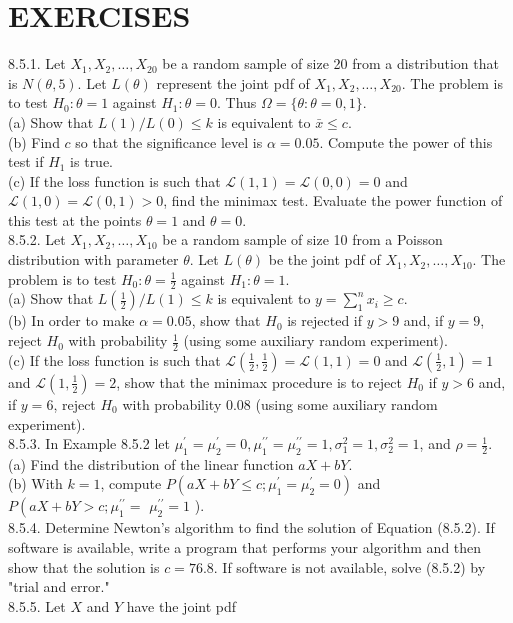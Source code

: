 \section*{EXERCISES}
8.5.1. Let $X_{1}, X_{2}, \ldots, X_{20}$ be a random sample of size 20 from a distribution that is $N(\theta, 5)$. Let $L(\theta)$ represent the joint pdf of $X_{1}, X_{2}, \ldots, X_{20}$. The problem is to test $H_{0}: \theta=1$ against $H_{1}: \theta=0$. Thus $\Omega=\{\theta: \theta=0,1\}$.\\
(a) Show that $L(1) / L(0) \leq k$ is equivalent to $\bar{x} \leq c$.\\
(b) Find $c$ so that the significance level is $\alpha=0.05$. Compute the power of this test if $H_{1}$ is true.\\
(c) If the loss function is such that $\mathcal{L}(1,1)=\mathcal{L}(0,0)=0$ and $\mathcal{L}(1,0)=\mathcal{L}(0,1)>0$, find the minimax test. Evaluate the power function of this test at the points $\theta=1$ and $\theta=0$.\\
8.5.2. Let $X_{1}, X_{2}, \ldots, X_{10}$ be a random sample of size 10 from a Poisson distribution with parameter $\theta$. Let $L(\theta)$ be the joint pdf of $X_{1}, X_{2}, \ldots, X_{10}$. The problem is to test $H_{0}: \theta=\frac{1}{2}$ against $H_{1}: \theta=1$.\\
(a) Show that $L\left(\frac{1}{2}\right) / L(1) \leq k$ is equivalent to $y=\sum_{1}^{n} x_{i} \geq c$.\\
(b) In order to make $\alpha=0.05$, show that $H_{0}$ is rejected if $y>9$ and, if $y=9$, reject $H_{0}$ with probability $\frac{1}{2}$ (using some auxiliary random experiment).\\
(c) If the loss function is such that $\mathcal{L}\left(\frac{1}{2}, \frac{1}{2}\right)=\mathcal{L}(1,1)=0$ and $\mathcal{L}\left(\frac{1}{2}, 1\right)=1$ and $\mathcal{L}\left(1, \frac{1}{2}\right)=2$, show that the minimax procedure is to reject $H_{0}$ if $y>6$ and, if $y=6$, reject $H_{0}$ with probability 0.08 (using some auxiliary random experiment).\\
8.5.3. In Example 8.5.2 let $\mu_{1}^{\prime}=\mu_{2}^{\prime}=0, \mu_{1}^{\prime \prime}=\mu_{2}^{\prime \prime}=1, \sigma_{1}^{2}=1, \sigma_{2}^{2}=1$, and $\rho=\frac{1}{2}$.\\
(a) Find the distribution of the linear function $a X+b Y$.\\
(b) With $k=1$, compute $P\left(a X+b Y \leq c ; \mu_{1}^{\prime}=\mu_{2}^{\prime}=0\right)$ and $P\left(a X+b Y>c ; \mu_{1}^{\prime \prime}=\right.$ $\mu_{2}^{\prime \prime}=1$ ).\\
8.5.4. Determine Newton's algorithm to find the solution of Equation (8.5.2). If software is available, write a program that performs your algorithm and then show that the solution is $c=76.8$. If software is not available, solve (8.5.2) by "trial and error."\\
8.5.5. Let $X$ and $Y$ have the joint pdf

